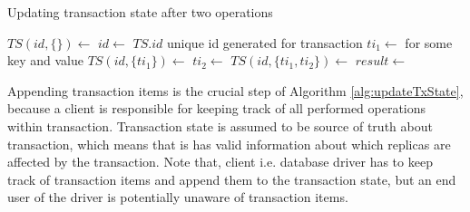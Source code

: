 

\begin{algorithm}
  \caption{Updating transaction state after two operations}
  \label{alg:updateTxState}
  \begin{algorithmic}  	    
    \State $TS(id, \{ \}) \gets$ 
    \State $id \gets$ $TS.id$ unique id generated for transaction
    \State $ti_{1} \gets $  \Comment for some key and value
    \State $TS(id, \{ ti_{1} \}) \gets$ 
    \State $ti_{2} \gets $ 
    \State $TS(id, \{ ti_{1}, ti_{2} \}) \gets$  
    \State $result \gets $     
  \end{algorithmic}
\end{algorithm}

Appending transaction items is the crucial step of Algorithm \ref{alg:updateTxState}, because a client is responsible for keeping track of all performed operations within transaction. Transaction state is assumed to be source of truth about transaction, which means that is has valid information about which replicas are affected by the transaction.
Note that, client i.e. database driver has to keep track of transaction items and append them to the transaction state, but an end user of the driver is potentially unaware of transaction items.


